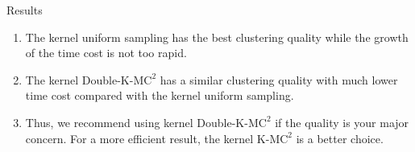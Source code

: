 \documentclass{beamer}
\begin{document}
\begin{frame}{Results}
	\begin{minipage}{0.4\linewidth}
		\scriptsize
		\begin{enumerate}
			\item The kernel uniform sampling has the best clustering quality while the growth of the time cost is not too rapid. 
			\item The kernel Double-K-M$\text{C}^2$ has a similar clustering quality with much lower time cost compared with the kernel uniform sampling. 
			\item Thus, we recommend using kernel Double-K-M$\text{C}^2$ if the quality is your major concern. For a more efficient result, the kernel K-M$\text{C}^2$ is a better choice.
		\end{enumerate}
	\end{minipage}
\end{frame}
\end{document}
